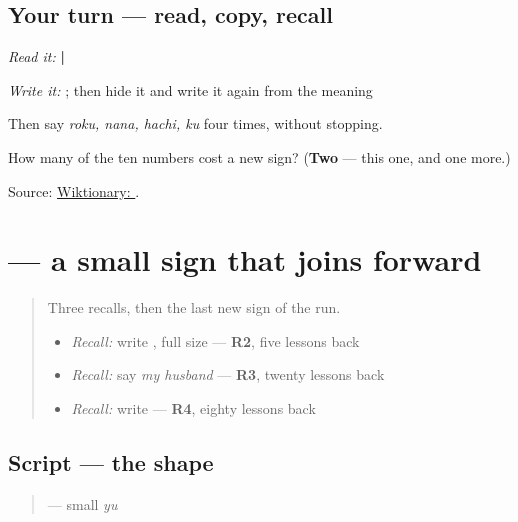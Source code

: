 \subsection*{Your turn — read, copy, recall}
\emph{Read it:} \textbf{ | }

\emph{Write it:} \textbf{}; then hide it and write it again from the meaning

Then say \emph{roku, nana, hachi, ku} four times, without stopping.

\begin{tcolorbox}[breakable,colback=teal!4,colframe=teal!35!black,title={Before you move on}]
How many of the ten numbers cost a new sign? (\textbf{Two} — this one, and one more.)

Source: \href{https://en.wiktionary.org/wiki/\%E3\%82\%8D\%E3\%81\%8F}{Wiktionary: }.
\end{tcolorbox}
\section[\texorpdfstring{\ja{ゅ} (small yu)}{ゅ (small yu)}]{ — a small sign that joins forward}

\label{lesson:JA-W15-small-yu}



\begin{quote}
Three recalls, then the last new sign of the run.

\begin{itemize}
\raggedright
  \item \emph{Recall:} write \textbf{}, full size — \textbf{R2}, five lessons back
  \item \emph{Recall:} say \emph{my husband} — \textbf{R3}, twenty lessons back
  \item \emph{Recall:} write \textbf{} — \textbf{R4}, eighty lessons back
\end{itemize}
\end{quote}

\subsection*{Script — the shape}

\begin{quote}
\textbf{} — small \emph{yu}
\end{quote}

